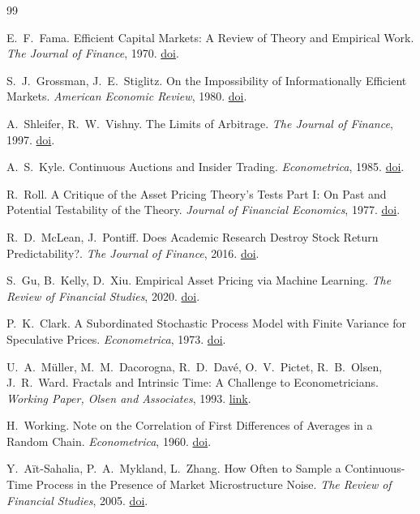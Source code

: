 \begin{thebibliography}{99}
\small

 E.~F.~Fama. Efficient Capital Markets: A Review of Theory and Empirical Work. \emph{The Journal of Finance}, 1970. \href{https://doi.org/10.1111/j.1540-6261.1970.tb00518.x}{doi}.

 S.~J.~Grossman, J.~E.~Stiglitz. On the Impossibility of Informationally Efficient Markets. \emph{American Economic Review}, 1980. \href{https://doi.org/10.7916/d8765r99}{doi}.

 A.~Shleifer, R.~W.~Vishny. The Limits of Arbitrage. \emph{The Journal of Finance}, 1997. \href{https://doi.org/10.1111/j.1540-6261.1997.tb03807.x}{doi}.

 A.~S.~Kyle. Continuous Auctions and Insider Trading. \emph{Econometrica}, 1985. \href{https://doi.org/10.2307/1913210}{doi}.

 R.~Roll. A Critique of the Asset Pricing Theory's Tests Part I: On Past and Potential Testability of the Theory. \emph{Journal of Financial Economics}, 1977. \href{https://doi.org/10.1016/0304-405x(77)90009-5}{doi}.

 R.~D.~McLean, J.~Pontiff. Does Academic Research Destroy Stock Return Predictability?. \emph{The Journal of Finance}, 2016. \href{https://doi.org/10.1111/jofi.12365}{doi}.

 S.~Gu, B.~Kelly, D.~Xiu. Empirical Asset Pricing via Machine Learning. \emph{The Review of Financial Studies}, 2020. \href{https://doi.org/10.1093/rfs/hhaa009}{doi}.

 P.~K.~Clark. A Subordinated Stochastic Process Model with Finite Variance for Speculative Prices. \emph{Econometrica}, 1973. \href{https://doi.org/10.2307/1913889}{doi}.

 U.~A.~Müller, M.~M.~Dacorogna, R.~D.~Davé, O.~V.~Pictet, R.~B.~Olsen, J.~R.~Ward. Fractals and Intrinsic Time: A Challenge to Econometricians. \emph{Working Paper, Olsen and Associates}, 1993. \href{https://ideas.repec.org/p/wop/olaswp/_009.html}{link}.

 H.~Working. Note on the Correlation of First Differences of Averages in a Random Chain. \emph{Econometrica}, 1960. \href{https://doi.org/10.2307/1907574}{doi}.

 Y.~Aït-Sahalia, P.~A.~Mykland, L.~Zhang. How Often to Sample a Continuous-Time Process in the Presence of Market Microstructure Noise. \emph{The Review of Financial Studies}, 2005. \href{https://doi.org/10.1093/rfs/hhi016}{doi}.


\end{thebibliography}
